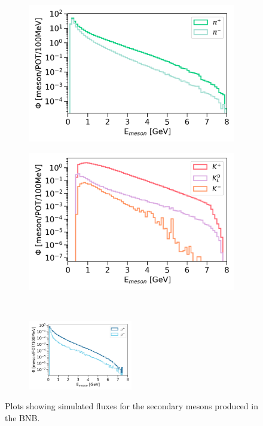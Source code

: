 \begin{figure}[t!]
\begin{subfigure}{.5\linewidth}
\centering
\includegraphics[width=1.0\textwidth]{BNB_Meson_Pion_Flux}
\end{subfigure}%
\begin{subfigure}{.5\linewidth}
\centering
\includegraphics[width=1.0\textwidth]{BNB_Meson_Kaon_Flux}
\end{subfigure}\\[1ex]
\begin{subfigure}{\linewidth}
\centering
\includegraphics[width=0.5\textwidth]{BNB_Meson_Muon_Flux}
\end{subfigure}
\caption[Secondary Mesons in the BNB Fluxes]{
Plots showing simulated fluxes for the secondary mesons produced in the BNB. 
}
\label{fig:BNB_Meson_Flux}
\end{figure}

